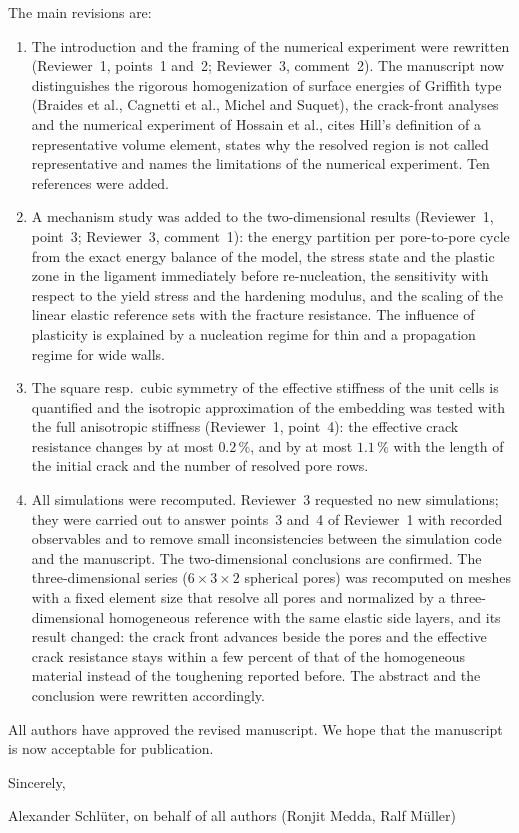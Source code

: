 \documentclass[11pt]{article}
\begin{document}
The main revisions are:
\begin{enumerate}
\item The introduction and the framing of the numerical experiment were rewritten (Reviewer~1, points~1 and~2; Reviewer~3, comment~2). The manuscript now distinguishes the rigorous homogenization of surface energies of Griffith type (Braides et al., Cagnetti et al., Michel and Suquet), the crack-front analyses and the numerical experiment of Hossain et al., cites Hill's definition of a representative volume element, states why the resolved region is not called representative and names the limitations of the numerical experiment. Ten references were added.
\item A mechanism study was added to the two-dimensional results (Reviewer~1, point~3; Reviewer~3, comment~1): the energy partition per pore-to-pore cycle from the exact energy balance of the model, the stress state and the plastic zone in the ligament immediately before re-nucleation, the sensitivity with respect to the yield stress and the hardening modulus, and the scaling of the linear elastic reference sets with the fracture resistance. The influence of plasticity is explained by a nucleation regime for thin and a propagation regime for wide walls.
\item The square resp.\ cubic symmetry of the effective stiffness of the unit cells is quantified and the isotropic approximation of the embedding was tested with the full anisotropic stiffness (Reviewer~1, point~4): the effective crack resistance changes by at most $0.2\,\%$, and by at most $1.1\,\%$ with the length of the initial crack and the number of resolved pore rows.
\item All simulations were recomputed. Reviewer~3 requested no new simulations; they were carried out to answer points~3
and~4 of Reviewer~1 with recorded observables and to remove small inconsistencies between the simulation code and the manuscript. The two-dimensional conclusions are confirmed. The
three-dimensional series ($6 \times 3 \times 2$ spherical pores) was recomputed on meshes with a fixed element size that resolve
all pores and normalized by a three-dimensional homogeneous reference with the same elastic side layers, and its result changed: the crack front
advances beside the pores and the effective crack resistance stays within a few percent of that of the homogeneous material
instead of the toughening reported before. The abstract and the conclusion were rewritten accordingly.
\end{enumerate}

\noindent All authors have approved the revised manuscript. We hope that the manuscript is now acceptable for publication.

\vspace{3mm}
\noindent Sincerely,

\vspace{3mm}
\noindent Alexander Schl\"uter, on behalf of all authors (Ronjit Medda, Ralf M\"uller)
\end{document}
